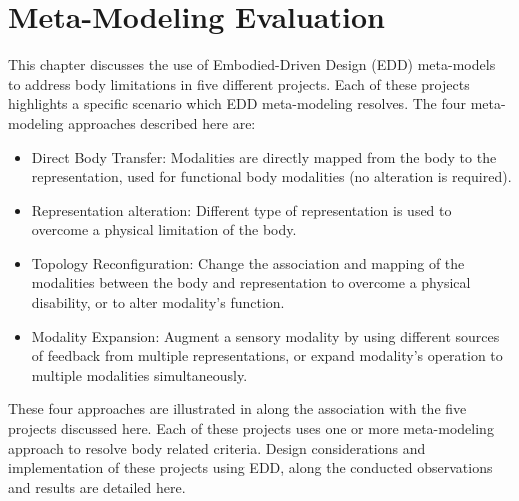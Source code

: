 \chapter{Meta-Modeling Evaluation}
\label{ch:eval}


This chapter discusses the use of Embodied-Driven Design (EDD) meta-models to address body limitations in five different projects. Each of these projects highlights a specific scenario which EDD meta-modeling resolves. The four meta-modeling approaches described here are: 
\begin{itemize}
    \item Direct Body Transfer: Modalities are directly mapped from the body to the representation, used for functional body modalities (no alteration is required).

    \item Representation alteration: Different type of representation is used to overcome a physical limitation of the body.
    
    \item Topology Reconfiguration: Change the association and mapping of the modalities between the body and representation to overcome a physical disability, or to alter modality's function.

    \item Modality Expansion: Augment a sensory modality by using different sources of feedback from multiple representations, or expand modality's operation to multiple modalities simultaneously.

\end{itemize}

These four approaches are illustrated in  along the association with the five projects discussed here. Each of these projects uses one or more meta-modeling approach to resolve body related criteria. Design considerations and implementation of these projects using EDD, along the conducted observations and results are detailed here.

